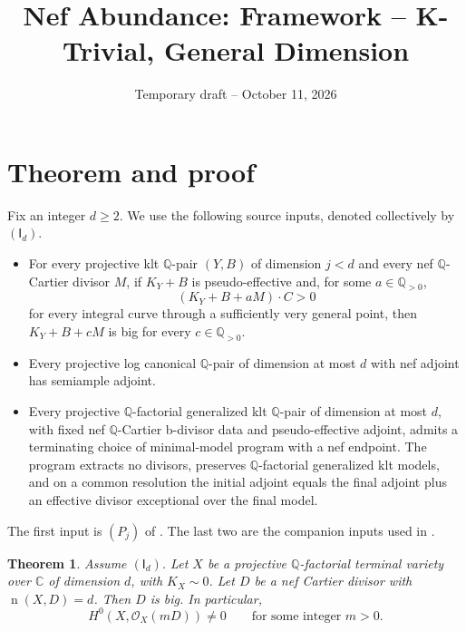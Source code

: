 \documentclass[12pt,a4paper,psamsfonts]{amsart}
\title{Nef Abundance: Framework -- K-Trivial, General Dimension}
\date{Temporary draft -- October 11, 2026}
\newtheorem*{theorem}{Theorem}
\theoremstyle{definition}
\theoremstyle{plain}
\newcommand{\Q}{\mathbb Q}
\newcommand{\C}{\mathbb C}
\newcommand{\OO}{\mathcal O}
\newcommand{\nef}{\operatorname{n}}
\begin{document}
\maketitle


\section{Theorem and proof}

Fix an integer $d\ge2$. We use the following source inputs,
denoted collectively by $(\mathsf I_d)$.
\begin{itemize}
\setlength{\itemsep}{2pt}
\setlength{\parsep}{0pt}
\item For every projective klt $\Q$-pair $(Y,B)$ of dimension
$j<d$ and every nef $\mathbb{Q}$-Cartier divisor $M$, if $K_Y+B$ is
pseudo-effective and, for some $a\in\Q_{>0}$,
\[
 (K_Y+B+aM)\cdot C>0
\]
for every integral curve through a sufficiently very general point,
then $K_Y+B+cM$ is big for every $c\in\Q_{>0}$.
\item Every projective log canonical $\Q$-pair of dimension at most
$d$ with nef adjoint has semiample adjoint.
\item Every projective $\Q$-factorial generalized klt $\Q$-pair of
dimension at most $d$, with fixed nef $\mathbb{Q}$-Cartier b-divisor
data and pseudo-effective adjoint, admits a terminating choice of
minimal-model program with a nef endpoint. The program extracts no
divisors, preserves $\Q$-factorial generalized klt models, and on a
common resolution the initial adjoint equals the final adjoint plus
an effective divisor exceptional over the final model.
\end{itemize}
The first input is $(P_j)$ of \cite[Section~3.1]{NS}. The last two
are the companion inputs used in \cite[Section~2]{NS}.

\begin{theorem}
Assume $(\mathsf I_d)$. Let $X$ be a projective $\Q$-factorial
terminal variety over $\C$ of dimension $d$, with $K_X\sim0$.
Let $D$ be a nef Cartier divisor with $\nef(X,D)=d$. Then $D$
is big. In particular,
\[
 H^0(X,\OO_X(mD))\ne0
 \qquad\text{for some integer }m>0.
\]
\end{theorem}
\end{document}
